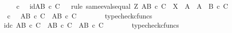 \begin{isabellebody}
\isanewline
\ \ \isamarkupfalse%
\ {\isachardoublequoteopen}{\isasympsi}\isactrlsup {\isasymsharp}\ {\isasymcirc}\isactrlsub c\ {\isasymphi}\isactrlsup {\isasymsharp}\isactrlsup {\isasymsharp}\ {\isacharequal}{\kern0pt}\ id{\isacharparenleft}{\kern0pt}A\isactrlbsup {\isacharparenleft}{\kern0pt}B\ {\isasymtimes}\isactrlsub c\ C{\isacharparenright}{\kern0pt}\isactrlesup {\isacharparenright}{\kern0pt}{\isachardoublequoteclose}\isanewline
\ \ \isamarkupfalse%
{\isacharparenleft}{\kern0pt}rule\ same{\isacharunderscore}{\kern0pt}evals{\isacharunderscore}{\kern0pt}equal{\isacharbrackleft}{\kern0pt}\ Z{\isacharequal}{\kern0pt}\ {\isachardoublequoteopen}A\isactrlbsup {\isacharparenleft}{\kern0pt}B\ {\isasymtimes}\isactrlsub c\ C{\isacharparenright}{\kern0pt}\isactrlesup {\isachardoublequoteclose}{\isacharcomma}{\kern0pt}\ \ X\ {\isacharequal}{\kern0pt}\ {\isachardoublequoteopen}A{\isachardoublequoteclose}{\isacharcomma}{\kern0pt}\ \ A\ {\isacharequal}{\kern0pt}\ {\isachardoublequoteopen}{\isacharparenleft}{\kern0pt}B\ {\isasymtimes}\isactrlsub c\ C{\isacharparenright}{\kern0pt}{\isachardoublequoteclose}{\isacharbrackright}{\kern0pt}{\isacharparenright}{\kern0pt}\isanewline
\ \ \ \ \isamarkupfalse%
\ {\isachardoublequoteopen}{\isasympsi}\isactrlsup {\isasymsharp}\ {\isasymcirc}\isactrlsub c\ {\isasymphi}\isactrlsup {\isasymsharp}\isactrlsup {\isasymsharp}\ {\isacharcolon}{\kern0pt}\ A\isactrlbsup {\isacharparenleft}{\kern0pt}B\ {\isasymtimes}\isactrlsub c\ C{\isacharparenright}{\kern0pt}\isactrlesup \ {\isasymrightarrow}\ A\isactrlbsup {\isacharparenleft}{\kern0pt}B\ {\isasymtimes}\isactrlsub c\ C{\isacharparenright}{\kern0pt}\isactrlesup {\isachardoublequoteclose}\isanewline
\ \ \ \ \ \ \isamarkupfalse%
\ typecheck{\isacharunderscore}{\kern0pt}cfuncs\isanewline
\ \ \ \ \isamarkupfalse%
\ {\isachardoublequoteopen}id\isactrlsub c\ {\isacharparenleft}{\kern0pt}A\isactrlbsup {\isacharparenleft}{\kern0pt}B\ {\isasymtimes}\isactrlsub c\ C{\isacharparenright}{\kern0pt}\isactrlesup {\isacharparenright}{\kern0pt}\ {\isacharcolon}{\kern0pt}\ A\isactrlbsup {\isacharparenleft}{\kern0pt}B\ {\isasymtimes}\isactrlsub c\ C{\isacharparenright}{\kern0pt}\isactrlesup \ {\isasymrightarrow}\ A\isactrlbsup {\isacharparenleft}{\kern0pt}B\ {\isasymtimes}\isactrlsub c\ C{\isacharparenright}{\kern0pt}\isactrlesup {\isachardoublequoteclose}\isanewline
\ \ \ \ \ \ \isamarkupfalse%
\ typecheck{\isacharunderscore}{\kern0pt}cfuncs\isanewline
\ \ \ \ \isamarkupfalse%

\end{isabellebody}
